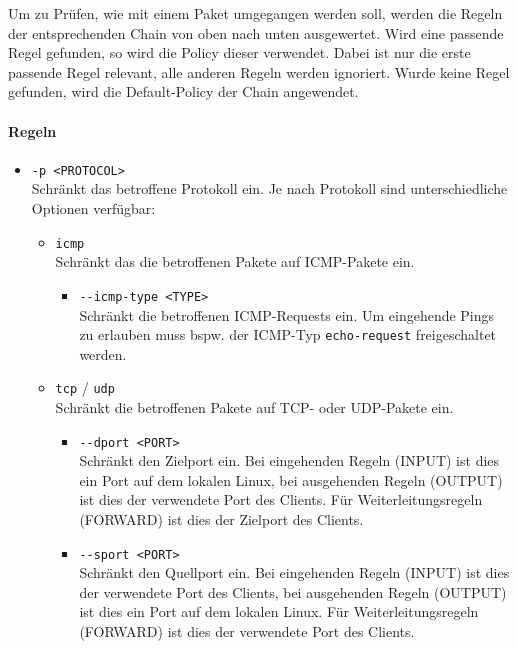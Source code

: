 \documentclass[a4paper, 11pt, accentcolor = tud3b]{tudreport}
\begin{document}
				    Um zu Prüfen, wie mit einem Paket umgegangen werden soll, werden die Regeln der entsprechenden Chain von oben nach unten ausgewertet. Wird eine passende Regel gefunden, so wird die Policy dieser verwendet. Dabei ist nur die erste passende Regel relevant, alle anderen Regeln werden ignoriert. Wurde keine Regel gefunden, wird die Default-Policy der Chain angewendet.
			    
			    \paragraph{Regeln}
				    \begin{itemize}
				    	\item \texttt{-p <PROTOCOL>} \\ Schränkt das betroffene Protokoll ein. Je nach Protokoll sind unterschiedliche Optionen verfügbar:
					    	\begin{itemize}
					    		\item \texttt{icmp} \\ Schränkt das die betroffenen Pakete auf ICMP-Pakete ein.
						    		\begin{itemize}
						    			\item \texttt{-{}-icmp-type <TYPE>} \\ Schränkt die betroffenen ICMP-Requests ein. Um eingehende Pings zu erlauben muss bspw. der ICMP-Typ \texttt{echo-request} freigeschaltet werden.
						    		\end{itemize}
					    		\item \texttt{tcp} / \texttt{udp} \\ Schränkt die betroffenen Pakete auf TCP- oder UDP-Pakete ein.
						    		\begin{itemize}
						    			\item \texttt{-{}-dport <PORT>} \\ Schränkt den Zielport ein. Bei eingehenden Regeln (INPUT) ist dies ein Port auf dem lokalen Linux, bei ausgehenden Regeln (OUTPUT) ist dies der verwendete Port des Clients. Für Weiterleitungsregeln (FORWARD) ist dies der Zielport des Clients.
						    			\item \texttt{-{}-sport <PORT>} \\ Schränkt den Quellport ein. Bei eingehenden Regeln (INPUT) ist dies der verwendete Port des Clients, bei ausgehenden Regeln (OUTPUT) ist dies ein Port auf dem lokalen Linux. Für Weiterleitungsregeln (FORWARD) ist dies der verwendete Port des Clients.
						    		\end{itemize}

\end{itemize}
\end{itemize}
\end{document}
